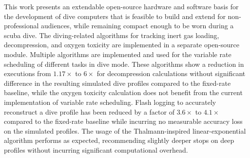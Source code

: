 This work presents an extendable open-source hardware and software basis for the development of dive computers that is feasible to build and extend for non-professional audiences, while remaining compact enough to be worn during a scuba dive.
The diving-related algorithms for tracking inert gas loading, decompression, and oxygen toxicity are implemented in a separate open-source module.
Multiple algorithms are implemented and used for the variable rate scheduling of different tasks in dive mode.
These algorithms show a reduction in executions from $1.17\times$ to $6\times$ for decompression calculations without significant difference in the resulting simulated dive profiles compared to the fixed-rate baseline, while the oxygen toxicity calculation does not benefit from the current implementation of variable rate scheduling.
Flash logging to accurately reconstruct a dive profile has been reduced by a factor of $3.6\times$ to $4.1\times$ compared to the fixed-rate baseline while incurring no measurable accuracy loss on the simulated profiles.
The usage of the Thalmann-inspired linear-exponential algorithm performs as expected, recommending slightly deeper stops on deep profiles without incurring significant computational overhead.
